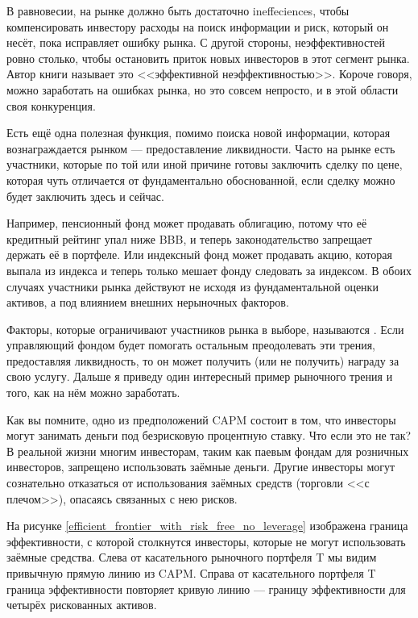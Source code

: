 В равновесии, на рынке должно быть достаточно 
{ineffeciences}, чтобы компенсировать инвестору расходы на поиск информации и 
риск, который он несёт, пока исправляет ошибку рынка. С другой стороны, 
неэффективностей ровно столько, чтобы остановить приток новых инвесторов в этот 
сегмент рынка. Автор книги \cite{pedersen2015efficiently} называет это 
<<эффективной неэффективностью>>. Короче говоря, можно заработать на ошибках 
рынка, но это совсем непросто, и в этой области своя конкуренция.

Есть ещё одна полезная функция, помимо поиска новой информации, которая 
вознаграждается рынком --- предоставление ликвидности. Часто на рынке есть 
участники, которые по той или иной причине готовы заключить сделку по цене, 
которая чуть отличается от фундаментально обоснованной, если сделку можно будет 
заключить здесь и сейчас.

Например, пенсионный фонд может продавать облигацию, потому что её кредитный 
рейтинг упал ниже BBB, и теперь законодательство запрещает держать её в 
портфеле. Или индексный фонд может продавать акцию, которая выпала из индекса и 
теперь только мешает фонду следовать за индексом. В обоих случаях участники 
рынка действуют не исходя из фундаментальной оценки активов, а под влиянием 
внешних нерыночных факторов.

Факторы, которые ограничивают участников рынка в выборе, называются 
. Если управляющий фондом будет 
помогать остальным преодолевать эти трения, предоставляя ликвидность, то он
может получить (или не получить) награду за свою услугу. Дальше я приведу 
один интересный пример рыночного трения и того, как на нём можно заработать.

Как вы помните, одно из предположений CAPM состоит в том, что инвесторы могут 
занимать деньги под безрисковую процентную ставку. Что если это не так? В 
реальной жизни многим инвесторам, таким как паевым фондам для розничных 
инвесторов, запрещено использовать заёмные деньги. Другие инвесторы могут 
сознательно отказаться от использования заёмных средств (торговли <<с плечом>>), опасаясь связанных с нею рисков.

На рисунке \ref{efficient_frontier_with_risk_free_no_leverage} изображена 
граница эффективности, с которой столкнутся инвесторы, которые не могут 
использовать заёмные средства. Слева от касательного рыночного портфеля T мы
видим привычную прямую линию из CAPM. Справа от касательного портфеля T граница
эффективности повторяет кривую линию --- границу эффективности для четырёх
рискованных активов.

